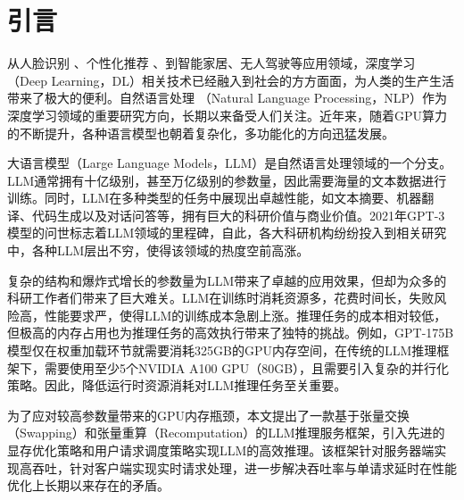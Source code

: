 \section{引言}

从人脸识别 \cite{Face-Recognition}、个性化推荐 \cite{Personal-Recommendation}、到智能家居\cite{Smart-Home}、无人驾驶\cite{Self-Driving-Car}等应用领域，深度学习 \cite{Deep-Learning}（Deep Learning，DL）相关技术已经融入到社会的方方面面，为人类的生产生活带来了极大的便利。自然语言处理 \cite{NLP}（Natural Language Processing，NLP）作为深度学习领域的重要研究方向，长期以来备受人们关注。近年来，随着GPU算力的不断提升，各种语言模型也朝着复杂化，多功能化的方向迅猛发展。 \par

大语言模型\cite{LLM}（Large Language Models，LLM）是自然语言处理领域的一个分支。LLM通常拥有十亿级别，甚至万亿级别的参数量，因此需要海量的文本数据进行训练。同时，LLM在多种类型的任务中展现出卓越性能，如文本摘要\cite{Text-Summarization}、机器翻译\cite{Machine-Translation}、代码生成\cite{Code-Generation}以及对话问答\cite{Question-Answer}等，拥有巨大的科研价值与商业价值。2021年GPT-3模型\cite{Text-Summarization, GPT3}的问世标志着LLM领域的里程碑，自此，各大科研机构纷纷投入到相关研究中，各种LLM层出不穷，使得该领域的热度空前高涨。 \par

复杂的结构和爆炸式增长的参数量为LLM带来了卓越的应用效果，但却为众多的科研工作者们带来了巨大难关。LLM在训练时消耗资源多，花费时间长，失败风险高，性能要求严，使得LLM的训练成本急剧上涨。推理任务的成本相对较低，但极高的内存占用也为推理任务的高效执行带来了独特的挑战。例如，GPT-175B模型仅在权重加载环节就需要消耗325GB的GPU内存空间\cite{GPT-175B资源消耗}，在传统的LLM推理框架下，需要使用至少5个NVIDIA A100 GPU（80GB），且需要引入复杂的并行化策略。因此，降低运行时资源消耗对LLM推理任务至关重要。\par


为了应对较高参数量带来的GPU内存瓶颈，本文提出了一款基于张量交换\cite{Swapping}（Swapping）和张量重算\cite{Recomputation}（Recomputation）的LLM推理服务框架，引入先进的显存优化策略和用户请求调度策略实现LLM的高效推理。该框架针对服务器端实现高吞吐，针对客户端实现实时请求处理，进一步解决吞吐率与单请求延时在性能优化上长期以来存在的矛盾。 \par

